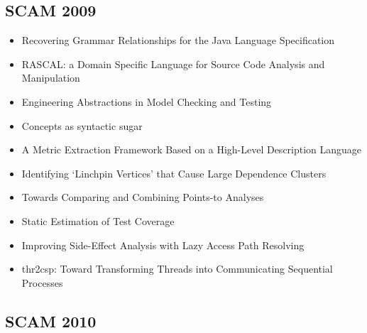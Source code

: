 \subsection{SCAM 2009}

{\small
\begin{itemize}[itemsep=-1ex]
  \item Recovering Grammar Relationships for the Java Language Specification
  \item RASCAL: a Domain Specific Language for Source Code Analysis and Manipulation
  \item Engineering Abstractions in Model Checking and Testing
  \item Concepts as syntactic sugar
  \item A Metric Extraction Framework Based on a High-Level Description Language
  \item Identifying ‘Linchpin Vertices’ that Cause Large Dependence Clusters
  \item Towards Comparing and Combining Points-to Analyses
  \item Static Estimation of Test Coverage
  \item Improving Side-Effect Analysis with Lazy Access Path Resolving
  \item thr2csp: Toward Transforming Threads into Communicating Sequential Processes
\end{itemize}
}

\subsection{SCAM 2010}

